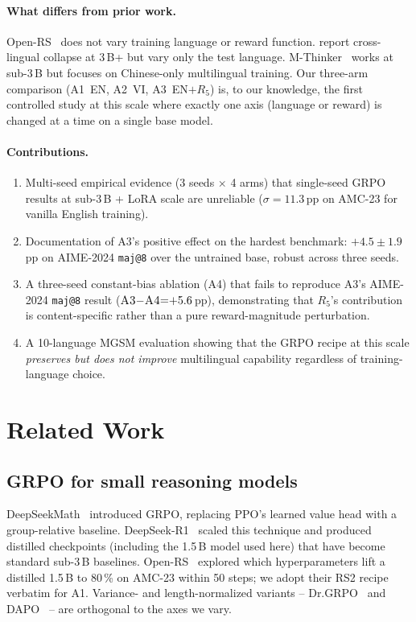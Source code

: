\documentclass[11pt]{article}
\newcommand{\armA}{\textsc{A1}}
\newcommand{\armB}{\textsc{A2}}
\newcommand{\armC}{\textsc{A3}}
\newcommand{\armD}{\textsc{A4}}
\begin{document}
\paragraph{What differs from prior work.}
Open-RS~\cite{openRS_2025} does not vary training language or reward function.
\citet{xlingual_collapse_2025} report cross-lingual collapse at $3$\,B+ but
vary only the test language. M-Thinker~\cite{mthinker_2025} works at sub-3\,B
but focuses on Chinese-only multilingual training. Our three-arm
comparison (\armA{}~EN, \armB{}~VI, \armC{}~EN${+}R_5$) is, to our
knowledge, the first controlled study at this scale where exactly one
axis (language or reward) is changed at a time on a single base model.

\paragraph{Contributions.}
\begin{enumerate}\itemsep0pt
\item Multi-seed empirical evidence (3 seeds $\times$ 4 arms) that
single-seed GRPO results at sub-3\,B + LoRA scale are unreliable
($\sigma{=}11.3$\,pp on AMC-23 for vanilla English training).
\item Documentation of \armC{}'s positive effect on the hardest
benchmark: $+4.5 \pm 1.9$\,pp on AIME-2024 \texttt{maj@8} over the
untrained base, robust across three seeds.
\item A three-seed constant-bias ablation (\armD{}) that fails to
reproduce \armC{}'s AIME-2024 \texttt{maj@8} result
($\armC{}{-}\armD{}{=}{+}5.6$\,pp), demonstrating that $R_5$'s
contribution is content-specific rather than a pure reward-magnitude
perturbation.
\item A 10-language MGSM evaluation showing that the GRPO recipe at
this scale \emph{preserves but does not improve} multilingual capability
regardless of training-language choice.
\end{enumerate}

\section{Related Work}
\label{sec:related}

\subsection{GRPO for small reasoning models}
DeepSeekMath~\cite{deepseekmath_2024} introduced GRPO, replacing PPO's
learned value head with a group-relative baseline. DeepSeek-R1~\cite{deepseekR1_2025}
scaled this technique and produced distilled checkpoints (including the
1.5\,B model used here) that have become standard sub-3\,B baselines.
Open-RS~\cite{openRS_2025} explored which hyperparameters lift a
distilled 1.5\,B to $80$\,\% on AMC-23 within 50 steps; we adopt their
RS2 recipe verbatim for \armA{}. Variance- and length-normalized
variants -- Dr.GRPO~\cite{drgrpo_2025} and DAPO~\cite{dapo_2025} --
are orthogonal to the axes we vary.
\end{document}
